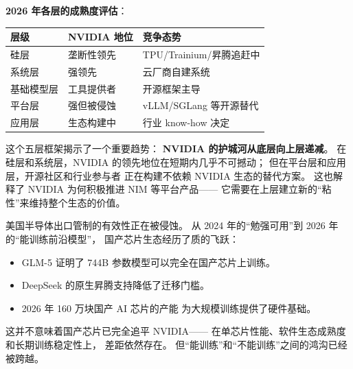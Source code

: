 \textbf{2026 年各层的成熟度评估}：
\begin{center}
\small
\begin{tabular}{lll}
\hline
\textbf{层级} & \textbf{NVIDIA 地位} & \textbf{竞争态势} \\
\hline
硅层 & 垄断性领先 & TPU/Trainium/昇腾追赶中 \\
系统层 & 强领先 & 云厂商自建系统 \\
基础模型层 & 工具提供者 & 开源框架主导 \\
平台层 & 强但被侵蚀 & vLLM/SGLang 等开源替代 \\
应用层 & 生态构建中 & 行业 know-how 决定 \\
\hline
\end{tabular}
\end{center}

这个五层框架揭示了一个重要趋势：
\textbf{NVIDIA 的护城河从底层向上层递减}。
在硅层和系统层，NVIDIA 的领先地位在短期内几乎不可撼动；
但在平台层和应用层，开源社区和行业参与者
正在构建不依赖 NVIDIA 生态的替代方案。
这也解释了 NVIDIA 为何积极推进 NIM 等平台产品——
它需要在上层建立新的``粘性''来维持整个生态的价值。

\begin{keybox}[国产算力的战略意义]
美国半导体出口管制的有效性正在被侵蚀。
从 2024 年的``勉强可用''到 2026 年的``能训练前沿模型''，
国产芯片生态经历了质的飞跃：
\begin{itemize}[noitemsep]
  \item GLM-5 证明了 744B 参数模型可以完全在国产芯片上训练。
  \item DeepSeek 的原生昇腾支持降低了迁移门槛。
  \item 2026 年 160 万块国产 AI 芯片的产能
        为大规模训练提供了硬件基础。
\end{itemize}
这并不意味着国产芯片已完全追平 NVIDIA——
在单芯片性能、软件生态成熟度和长期训练稳定性上，
差距依然存在。
但``能训练''和``不能训练''之间的鸿沟已经被跨越。
\end{keybox}


